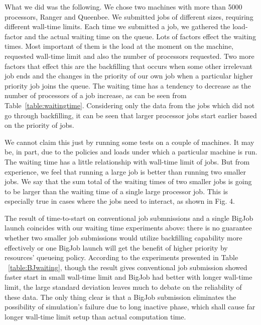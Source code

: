 \documentclass[conference,final]{IEEEtran}
\begin{document}
What we did was the following. We chose two machines with more than
5000 processors, Ranger and Queenbee. We submitted jobs of different
sizes, requiring different wall-time limits. Each time we submitted a
job, we gathered the load-factor and the actual waiting time on the
queue. Lots of factors effect the waiting times. Most important of
them is the load at the moment on the machine, requested wall-time
limit and also the number of processors requested. Two more factors
that effect this are the backfilling that occurs when some other
irrelevant job ends and the changes in the priority of our own job
when a particular higher priority job joins the queue.  The waiting
time has a tendency to decrease as the number of processors of a job
increase, as can be seen from Table~\ref{table:waitingtime}.
Considering only the data from the jobs which did not go through
backfilling, it can be seen that larger processor jobs start earlier
based on the priority of jobs.

We cannot claim this just by running some tests on a couple of
machines. It may be, in part, due to the policies and loads under
which a particular machine is run. The waiting time has a little
relationship with wall-time limit of jobs. But from experience, we
feel that running a large job is better than running two smaller
jobs. We say that the sum total of the waiting times of two smaller
jobs is going to be larger than the waiting time of a single large
processor job. This is especially true in cases where the jobs need to
interact, as shown in Fig. 4.

The result of time-to-start on conventional job submnissions and a single BigJob launch coincides with our waiting time experiments above: 
there is no guarantee whether two smaller job submissions would utilize backfilling capability more effectively or one BigJob launch will get the benefit of higher priority by resources' queueing policy. According to the experiments presented in Table ~\ref{table:BJwaiting}, though the result gives conventional job submission showed faster start in small wall-time limit and BigJob had better with longer wall-time limit, the large standard deviation leaves much to debate on the reliability of these data. The only thing clear is that a BigJob submission eliminates the possibility of simulation's failure due to long inactive phase, which shall cause far longer wall-time limit setup than actual computation time.
\end{document}
